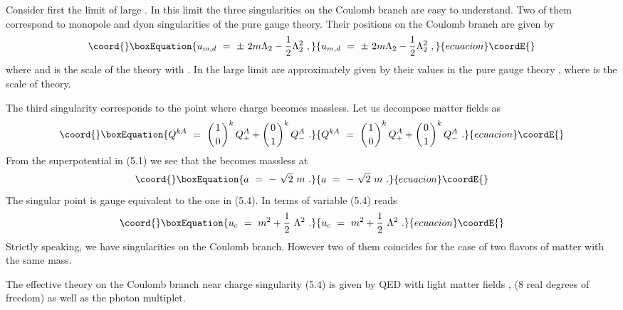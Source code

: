 \documentclass[a4paper,12pt]{article}
\begin{document}
Consider first the limit of large \coordHE{}. In this limit the  three
singularities on the Coulomb branch are easy to understand. Two
of them correspond to monopole and dyon singularities of the
pure gauge theory. Their positions on the Coulomb branch are
given by \cite{SW2}
\begin{equation}\coord{}\boxEquation{
u_{m,d}\ =\ \pm\ 2m\Lambda_2-\frac12\Lambda^2_2\ ,
}{
u_{m,d}\ =\ \pm\ 2m\Lambda_2-\frac12\Lambda^2_2\ ,
}{ecuacion}\coordE{}\end{equation}
where \coordHE{} and \coordHE{} is
the scale of the theory with \coordHE{}.
In the large \coordHE{} limit \coordHE{} are
approximately given by their values in the pure gauge theory
\coordHE{}, where \myHighlight{$\Lambda$}\coordHE{}
is the scale of \coordHE{} theory.

The third singularity corresponds to the point where charge
becomes massless. Let us decompose matter fields as
\begin{equation}\coord{}\boxEquation{
Q^{kA}\ =\ \left({1\atop 0}\right)^k Q^A_++\left({0\atop 1}
\right)^kQ^A_-\ .
}{
Q^{kA}\ =\ \left({1\atop 0}\right)^k Q^A_++\left({0\atop 1}
\right)^kQ^A_-\ .
}{ecuacion}\coordE{}\end{equation}
From the superpotential in (5.1) we see that the \coordHE{} becomes
massless at
\begin{equation}\coord{}\boxEquation{
a\ =\ -\ \sqrt2\ m\ .
}{
a\ =\ -\ \sqrt2\ m\ .
}{ecuacion}\coordE{}\end{equation}
The singular point \coordHE{} is gauge equivalent to the one
in (5.4). In terms of variable \coordHE{} (5.4) reads
\begin{equation}\coord{}\boxEquation{
u_c\ =\ m^2+\frac12\ \Lambda^2\ .
}{
u_c\ =\ m^2+\frac12\ \Lambda^2\ .
}{ecuacion}\coordE{}\end{equation}
Strictly speaking, we have \coordHE{} singularities on the
Coulomb branch. However two of them  coincides for the case of
two flavors of matter with the same mass.

The effective theory on the Coulomb branch near charge
singularity (5.4) is given by \coordHE{} QED with light matter fields
\coordHE{}, \coordHE{} (8 real degrees of freedom) as well as the
photon multiplet.
\end{document}
